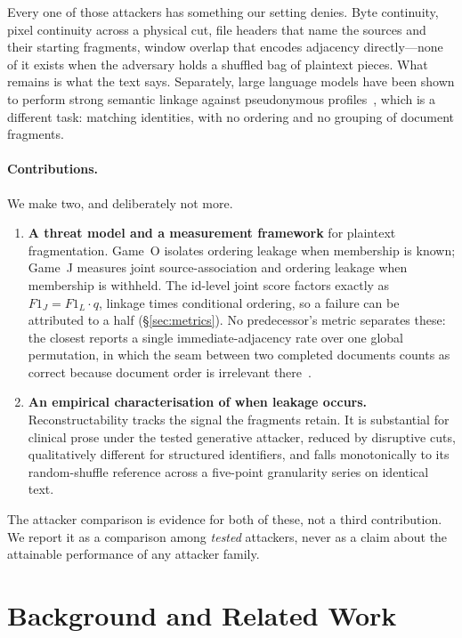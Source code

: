 \documentclass[sigconf,nonacm]{acmart}
\newcommand{\FJ}{\ensuremath{F1_J}}
\newcommand{\FL}{\ensuremath{F1_L}}
\begin{document}
Every one of those attackers has something our setting denies. Byte continuity,
pixel continuity across a physical cut, file headers that name the sources and
their starting fragments, window overlap that encodes adjacency directly---none
of it exists when the adversary holds a shuffled bag of plaintext pieces. What
remains is what the text says. Separately, large language models have been shown
to perform strong semantic linkage against pseudonymous
profiles~\cite{lermen2026}, which is a different task: matching identities, with
no ordering and no grouping of document fragments.

\paragraph{Contributions.}
We make two, and deliberately not more.

\begin{enumerate}
\item \textbf{A threat model and a measurement framework} for plaintext
fragmentation. Game~O isolates ordering leakage when membership is known; Game~J
measures joint source-association and ordering leakage when membership is
withheld. The id-level joint score factors exactly as $\FJ = \FL \cdot q$,
linkage times conditional ordering, so a failure can be attributed to a half
(\S\ref{sec:metrics}). No predecessor's metric separates these: the closest
reports a single immediate-adjacency rate over one global permutation, in which
the seam between two completed documents counts as correct because document
order is irrelevant there~\cite{paixao2020}.

\item \textbf{An empirical characterisation of when leakage occurs.}
Reconstructability tracks the signal the fragments retain. It is substantial for
clinical prose under the tested generative attacker, reduced by disruptive cuts,
qualitatively different for structured identifiers, and falls monotonically to
its random-shuffle reference across a five-point granularity series on identical
text.
\end{enumerate}

The attacker comparison is evidence for both of these, not a third contribution.
We report it as a comparison among \emph{tested} attackers, never as a claim
about the attainable performance of any attacker family.

\section{Background and Related Work}
\label{sec:related}
\end{document}
